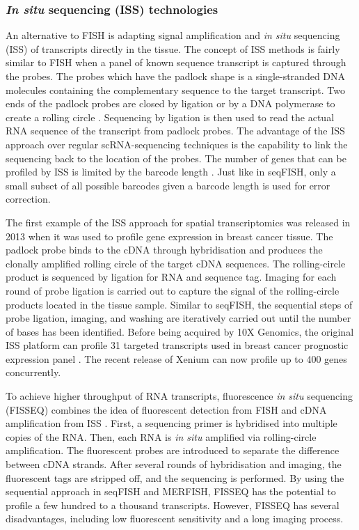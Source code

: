 \subsubsection{\textit{In situ} sequencing (ISS) technologies}
An alternative to FISH is adapting signal amplification and \textit{in situ} sequencing (ISS) of transcripts directly in the tissue. The concept of ISS methods is fairly similar to FISH when a panel of known sequence transcript is captured through the probes. The probes which have the padlock shape is a single-stranded DNA molecules containing the complementary sequence to the target transcript. Two ends of the padlock probes are closed by ligation or by a DNA polymerase to create a rolling circle \cite{conrad2022single}. Sequencing by ligation is then used to read the actual RNA sequence of the transcript from padlock probes. The advantage of the ISS approach over regular scRNA-sequencing techniques is the capability to link the sequencing back to the location of the probes. The number of genes that can be profiled by ISS is limited by the barcode length \cite{williams2022introduction, asp2020spatially}. Just like in seqFISH, only a small subset of all possible barcodes given a barcode length is used for error correction.

The first example of the ISS approach for spatial transcriptomics was released in 2013 when it was used to profile gene expression in breast cancer tissue. The padlock probe binds to the cDNA through hybridisation and produces the  clonally amplified rolling circle of the target cDNA sequences. The rolling-circle product is sequenced by ligation for RNA and sequence tag. Imaging for each round of probe ligation is carried out to capture the signal of the rolling-circle products located in the tissue sample. Similar to seqFISH, the sequential steps of probe ligation, imaging, and washing are iteratively carried out until the number of bases has been identified. Before being acquired by 10X Genomics, the original ISS platform can profile 31 targeted transcripts used in breast cancer prognostic expression panel \cite{ke2013situ}. The recent release of Xenium can now profile up to 400 genes concurrently. 

To achieve higher throughput of RNA transcripts, fluorescence \textit{in situ} sequencing (FISSEQ) combines the idea of fluorescent detection from FISH and cDNA amplification from ISS \cite{lee2015fluorescent}. First, a sequencing primer is hybridised into multiple copies of the RNA. Then, each RNA is \textit{in situ} amplified via rolling-circle amplification. The fluorescent probes are introduced to separate the difference between cDNA strands. After several rounds of hybridisation and imaging, the fluorescent tags are stripped off, and the sequencing is performed. By using the sequential approach in seqFISH and MERFISH, FISSEQ has the potential to profile a few hundred to a thousand transcripts. However, FISSEQ has several disadvantages, including low fluorescent sensitivity and a long imaging process.  


